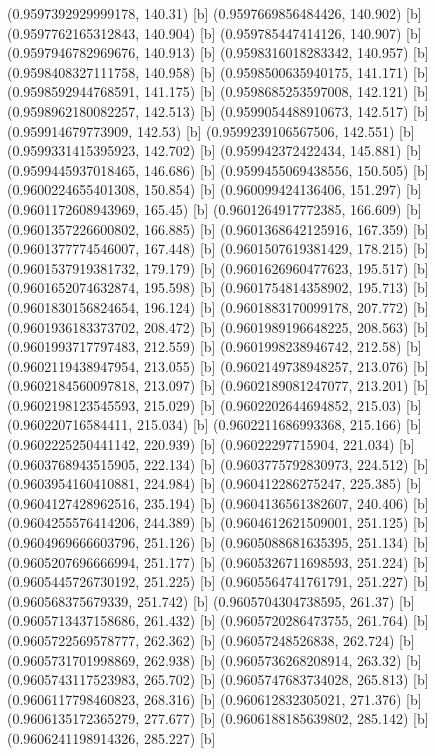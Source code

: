 {{{(0.9597392929999178, 140.31) [b] 
(0.9597669856484426, 140.902) [b] 
(0.9597762165312843, 140.904) [b] 
(0.959785447414126, 140.907) [b] 
(0.9597946782969676, 140.913) [b] 
(0.9598316018283342, 140.957) [b] 
(0.9598408327111758, 140.958) [b] 
(0.9598500635940175, 141.171) [b] 
(0.9598592944768591, 141.175) [b] 
(0.9598685253597008, 142.121) [b] 
(0.9598962180082257, 142.513) [b] 
(0.9599054488910673, 142.517) [b] 
(0.959914679773909, 142.53) [b] 
(0.9599239106567506, 142.551) [b] 
(0.9599331415395923, 142.702) [b] 
(0.959942372422434, 145.881) [b] 
(0.9599445937018465, 146.686) [b] 
(0.9599455069438556, 150.505) [b] 
(0.9600224655401308, 150.854) [b] 
(0.960099424136406, 151.297) [b] 
(0.9601172608943969, 165.45) [b] 
(0.9601264917772385, 166.609) [b] 
(0.9601357226600802, 166.885) [b] 
(0.9601368642125916, 167.359) [b] 
(0.9601377774546007, 167.448) [b] 
(0.9601507619381429, 178.215) [b] 
(0.9601537919381732, 179.179) [b] 
(0.9601626960477623, 195.517) [b] 
(0.9601652074632874, 195.598) [b] 
(0.9601754814358902, 195.713) [b] 
(0.9601830156824654, 196.124) [b] 
(0.9601883170099178, 207.772) [b] 
(0.9601936183373702, 208.472) [b] 
(0.9601989196648225, 208.563) [b] 
(0.9601993717797483, 212.559) [b] 
(0.9601998238946742, 212.58) [b] 
(0.9602119438947954, 213.055) [b] 
(0.9602149738948257, 213.076) [b] 
(0.9602184560097818, 213.097) [b] 
(0.9602189081247077, 213.201) [b] 
(0.9602198123545593, 215.029) [b] 
(0.9602202644694852, 215.03) [b] 
(0.960220716584411, 215.034) [b] 
(0.9602211686993368, 215.166) [b] 
(0.9602225250441142, 220.939) [b] 
(0.96022297715904, 221.034) [b] 
(0.9603768943515905, 222.134) [b] 
(0.9603775792830973, 224.512) [b] 
(0.9603954160410881, 224.984) [b] 
(0.960412286275247, 225.385) [b] 
(0.9604127428962516, 235.194) [b] 
(0.9604136561382607, 240.406) [b] 
(0.9604255576414206, 244.389) [b] 
(0.9604612621509001, 251.125) [b] 
(0.9604969666603796, 251.126) [b] 
(0.9605088681635395, 251.134) [b] 
(0.9605207696666994, 251.177) [b] 
(0.9605326711698593, 251.224) [b] 
(0.9605445726730192, 251.225) [b] 
(0.9605564741761791, 251.227) [b] 
(0.960568375679339, 251.742) [b] 
(0.9605704304738595, 261.37) [b] 
(0.9605713437158686, 261.432) [b] 
(0.9605720286473755, 261.764) [b] 
(0.9605722569578777, 262.362) [b] 
(0.96057248526838, 262.724) [b] 
(0.9605731701998869, 262.938) [b] 
(0.9605736268208914, 263.32) [b] 
(0.9605743117523983, 265.702) [b] 
(0.9605747683734028, 265.813) [b] 
(0.9606117798460823, 268.316) [b] 
(0.960612832305021, 271.376) [b] 
(0.9606135172365279, 277.677) [b] 
(0.9606188185639802, 285.142) [b] 
(0.9606241198914326, 285.227) [b] 
}}}
